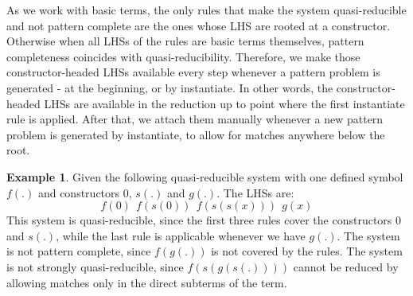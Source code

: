 \documentclass{report}
\theoremstyle{definition}
\newtheorem{example_inner}{Example}
\newenvironment{example}
  {\begin{customblock}\begin{example_inner}}
  {\end{example_inner}\end{customblock}}
\begin{document}
As we work with basic terms, the only rules that make the system quasi-reducible and not pattern complete are the ones whose LHS are rooted at a constructor. Otherwise when all LHSs of the rules are basic terms themselves, pattern completeness coincides with quasi-reducibility. Therefore, we make those constructor-headed LHSs available every step whenever a pattern problem is generated - at the beginning, or by instantiate. In other words, the constructor-headed LHSs are available in the reduction up to point where the first instantiate rule is applied. After that, we attach them manually whenever a new pattern problem is generated by instantiate, to allow for matches anywhere below the root.

\begin{example}\label{example:quasi} Given the following quasi-reducible system with one defined symbol $f(.)$ and constructors $0$, $s(.)$ and $g(.)$. The LHSs are:
$$f(0)\ \ f(s(0))\ \ f(s(s(x)))\ \ g(x)$$
This system is quasi-reducible, since the first three rules cover the constructors $0$ and $s(.)$, while the last rule is applicable whenever we have $g(.)$. The system is not pattern complete, since $f(g(.))$ is not covered by the rules. The system is not strongly quasi-reducible, since $f(s(g(s(.))))$ cannot be reduced by allowing matches only in the direct subterms of the term.
\end{example}
\end{document}
